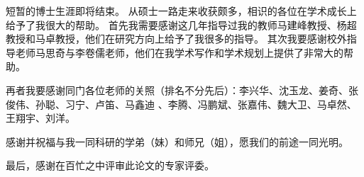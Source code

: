 短暂的博士生涯即将结束。
从硕士一路走来收获颇多，相识的各位在学术成长上给予了我很大的帮助。
首先我需要感谢这几年指导过我的教师马建峰教授、杨超教授和马卓教授，他们在研究方向上给予了我很多的指导。
其次我要感谢校外指导老师马思奇与李卷儒老师，他们在我学术写作和学术规划上提供了非常大的帮助。

再者我要感谢同门各位老师的关照（排名不分先后）：李兴华、沈玉龙、姜奇、张俊伟、孙聪、习宁、卢笛、马鑫迪
、李腾、冯鹏斌、张嘉伟、魏大卫、马卓然、王翔宇、刘洋。

感谢并祝福与我一同科研的学弟（妹）和师兄（姐），愿我们的前途一同光明。

最后，感谢在百忙之中评审此论文的专家评委。